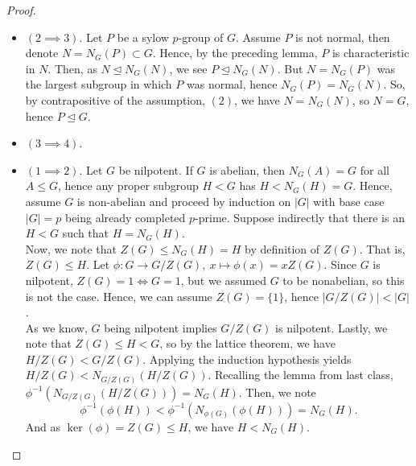 \begin{proof}
	\begin{itemize}
		\item \(\left( 2\implies 3 \right) \). Let \(P\) be a sylow \(p\)-group of \(G\). Assume \(P\) is not normal, then denote \(N = N_{G}\left( P \right) \subset G\). Hence, by the preceding lemma, \(P\) is characteristic in \(N\). Then, as \(N \trianglelefteq N_{G}\left( N \right) \), we see \(P \trianglelefteq N_G\left( N \right) \). But \(N = N_{G}\left( P \right) \) was the largest subgroup in which \(P\) was normal, hence \(N_{G}\left( P \right) = N_{G}\left( N \right) \). So, by contrapositive of the assumption, \((2)\), we have \(N  = N_{G}\left( N \right) \), so \(N = G\), hence \(P \trianglelefteq G\).
		\item \(\left( 3 \implies 4 \right) \).
		\item \(\left( 1\implies 2 \right) \). Let \(G\) be nilpotent. If \(G\) is abelian, then \(N_{G}\left( A \right)  = G\) for all \(A\le G\), hence any proper subgroup \(H < G\) has \( H < N_{G}\left( H \right)  = G\). Hence, assume \(G\) is non-abelian and proceed by induction on \(\left| G \right| \) with base case \(\left| G \right|  = p\) being already completed \(p\)-prime. Suppose indirectly that there is  an \(H < G\) such that \(H =  N_{G}\left( H \right) \).\\
			Now, we note that \(Z\left( G \right) \le N_{G}\left( H \right) = H \) by definition of \(Z\left( G \right) \). That is, \(Z\left( G \right)  \le H\). Let \(\phi: G \to G / Z\left( G \right) , \ x \mapsto \phi(x) = xZ\left( G \right) \). Since \(G\) is nilpotent, \(Z\left( G \right)  = 1 \iff G = 1\), but we assumed \(G\) to be nonabelian, so this is not the case. Hence, we can assume \(Z\left( G \right)  = \{1\} \), hence \(\left| G / Z\left( G \right)  \right|  < \left| G \right| \).\\
			As we know, \(G\) being nilpotent implies \(G / Z\left( G \right) \) is nilpotent. Lastly, we note that \(Z\left( G \right)  \le H < G\), so by the lattice theorem, we have \(H / Z\left( G \right)  < G / Z\left( G \right) \). Applying the induction hypothesis yields \(H / Z\left( G \right)  < N_{G / Z\left( G \right) }\left( H / Z\left( G \right)  \right) \). Recalling the lemma from last class, \(\phi^{-1}\left( N_{G / Z\left( G \right) }\left( H / Z\left( G \right)  \right)  \right) = N_{G}\left( H \right)  \). Then, we note \[
				\phi^{-1} \left( \phi\left( H \right)  \right)  < \phi^{-1}\left( N_{\phi\left( G \right) }\left( \phi\left( H \right)  \right)  \right) = N_{G}\left( H \right)
			.\]  And as \(\ker \left( \phi \right) = Z\left( G \right) \le H\), we have \(H < N_{G}\left( H \right) \).
	\end{itemize}


\end{proof}
